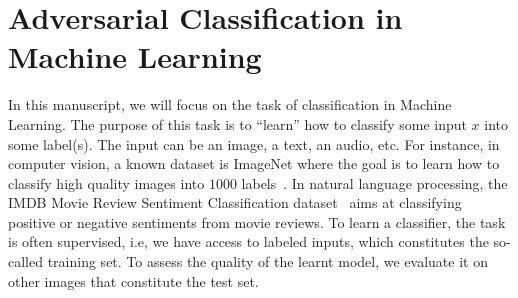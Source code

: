 



\section{Adversarial Classification in Machine Learning}

In this manuscript, we will focus on the task of classification in Machine Learning. The purpose of this task is to ``learn'' how to classify some input $x$ into some label(s). The input can be an image, a text, an audio, etc. For instance, in computer vision, a known dataset is ImageNet where the goal is to learn how to classify high quality images into $1000$ labels~\citep{imagenet_cvpr09}. In natural language processing, the IMDB Movie Review Sentiment Classification dataset~\citep{maas-EtAl:2011:ACL-HLT2011} aims at classifying positive or negative sentiments from movie reviews. To learn a classifier, the task is often supervised, i.e, we have access to labeled inputs, which constitutes the so-called training set. To assess the quality of the learnt model, we evaluate it on other images that constitute the test set.

